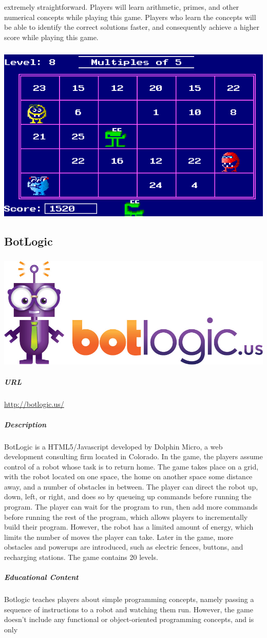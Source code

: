extremely straightforward. Players will learn arithmetic, primes, and other numerical concepts while playing this game. Players who learn the concepts will be able to identify the correct solutions faster, and consequently achieve a higher score while playing this game. \subparagraph{}\includegraphics[width = \textwidth]{img/munchers_screen.png}\subsection{BotLogic}\subparagraph{}\includegraphics[width = \textwidth]{img/botlogic_title.jpg}\subparagraph{URL}\url{http://botlogic.us/}\subparagraph{Description}BotLogic is a HTML5/Javascript developed by Dolphin Micro, a web development consulting firm located in Colorado. In the game, the players assume control of a robot whose task is to return home. The game takes place on a grid, with the robot located on one space, the home on another space some distance away, and a number of obstacles in between. The player can direct the robot up, down, left, or right, and does so by queueing up commands before running the program. The player can wait for the program to run, then add more commands before running the rest of the program, which allows players to incrementally build their program. However, the robot has a limited amount of energy, which limits the number of moves the player can take. Later in the game, more obstacles and powerups are introduced, such as electric fences, buttons, and recharging stations. The game contains 20 levels.\subparagraph{Educational Content}Botlogic teaches players about simple programming concepts, namely passing a sequence of instructions to a robot and watching them run. However, the game doesn't include any functional or object-oriented programming concepts, and is only 